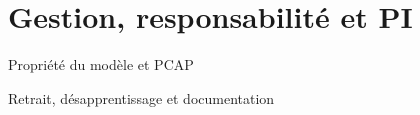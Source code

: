 \section{Gestion, responsabilité et PI}

\begin{frame}{Propriété du modèle et PCAP}
\end{frame}

\begin{frame}{Retrait, désapprentissage et documentation}
\end{frame}

